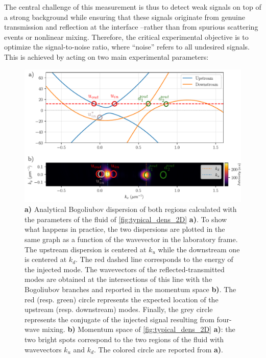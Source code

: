 The central challenge of this measurement is thus to detect weak signals on top of a strong background while ensuring that these signals originate from genuine transmission and reflection at the interface --rather than from spurious scattering events or nonlinear mixing. Therefore, the critical experimental objective is to optimize the signal-to-noise ratio, where “noise” refers to all undesired signals. This is achieved by acting on two main experimental parameters:


\begin{figure}
    \centering
    \includegraphics[width=1\textwidth]{chap_stimulated_hawking/fig/bh_k_space.pdf}
    \caption{\textbf{a)} Analytical Bogoliubov dispersion of both regions calculated with the parameters of the fluid of \autoref{fig:typical_dens_2D} \textbf{a)}. To show what happens in practice, the two dispersions are plotted in the same graph as a function of the wavevector in the laboratory frame. The upstream dispersion
    is centered at $k_u$ while the downstream one is centered at $k_d$. The red dashed line corresponds to the energy of the injected mode. The wavevectors of the reflected-transmitted modes are obtained 
    at the intersections of this line with the Bogoliubov branches and reported in the momentum space \textbf{b)}. The red (resp. green) circle represents the expected location 
    of the upstream (resp. downstream) modes. Finally, the grey circle represents the conjugate of the injected signal resulting from four-wave mixing. \textbf{b)} Momentum space of \autoref{fig:typical_dens_2D} \textbf{a)}: the two bright spots correspond to the two regions of the fluid with wavevectors $k_u$ and $k_d$. The colored circle
    are reported from \textbf{a)}.}
    \label{fig:bh_k_space}
\end{figure}

